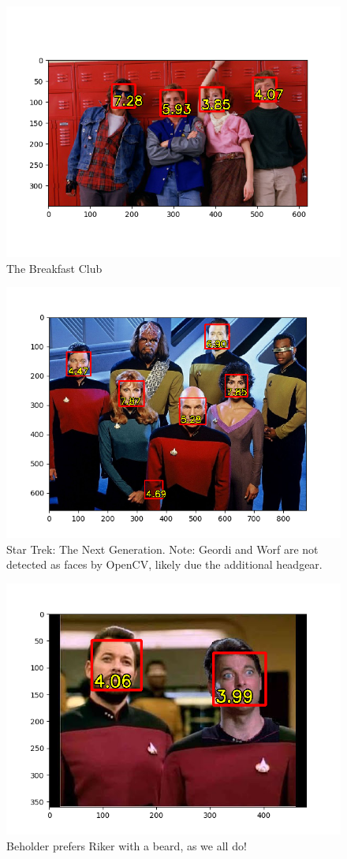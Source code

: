 \documentclass{article}
\begin{document}
\begin{figure}[H]
    \centering
    \includegraphics[width=.8\linewidth]{breakfast-club.png}
    \caption{The Breakfast Club}
\end{figure}

\begin{figure}[H]
    \centering
    \includegraphics[width=.8\linewidth]{star-trek-tng.png}
    \caption{Star Trek: The Next Generation. Note: Geordi and Worf are not detected as faces by OpenCV, likely due the additional headgear.}
\end{figure}

\begin{figure}[H]
    \centering
    \includegraphics[width=.8\linewidth]{riker-beard.png}
    \caption{Beholder prefers Riker with a beard, as we all do!}
\end{figure}
\end{document}
